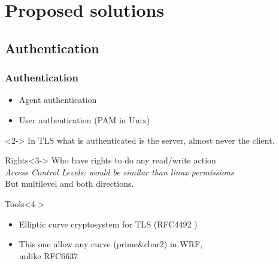 \documentclass{beamer}
\begin{document}
\section{Proposed solutions}


\subsection{Authentication}

\begin{frame}
\frametitle{Authentication}
    \begin{block}{}
        \begin{itemize}
            \item Agent authentication
            \item User authentication (PAM in Unix)
        \end{itemize}
    \end{block}
    \begin{exampleblock}{}<2->
        In TLS what is authenticated is the server, almost never the client.
    \end{exampleblock}
    \begin{block}{Rights}<3->
         Who have rights to do any read/write action\\
         \emph{Access Control Levels: would be similar than linux permissions}\\
         But multilevel and both directions.
    \end{block}
    \begin{alertblock}{Tools}<4->
        \begin{itemize}
            \item Elliptic curve cryptosystem for TLS (RFC4492 \cite{rfc4492})
            \item This one allow any curve (prime\&char2) in WRF,\\unlike RFC6637 \cite{rfc6637}
        \end{itemize}
    \end{alertblock}
\end{frame}
\end{document}
